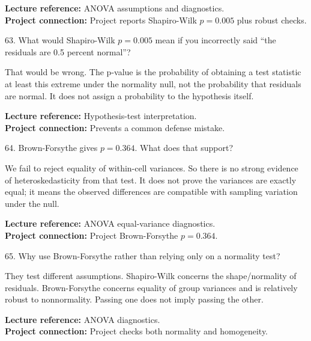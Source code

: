 \documentclass[10.5pt,a4paper]{article}
\newcommand{\chapref}[1]{\textbf{Lecture reference:} #1}
\newcommand{\projectref}[1]{\textbf{Project connection:} #1}
\begin{document}
\begin{refbox}\chapref{ANOVA assumptions and diagnostics.}\\\projectref{Project reports Shapiro-Wilk $p=0.005$ plus robust checks.}\end{refbox}
\begin{qbox}{63. What would Shapiro-Wilk $p=0.005$ mean if you incorrectly said ``the residuals are 0.5 percent normal''?}
\end{qbox}
\begin{answerbox}That would be wrong. The p-value is the probability of obtaining a test statistic at least this extreme under the normality null, not the probability that residuals are normal. It does not assign a probability to the hypothesis itself.\end{answerbox}
\begin{refbox}\chapref{Hypothesis-test interpretation.}\\\projectref{Prevents a common defense mistake.}\end{refbox}
\begin{qbox}{64. Brown-Forsythe gives $p=0.364$. What does that support?}
\end{qbox}
\begin{answerbox}We fail to reject equality of within-cell variances. So there is no strong evidence of heteroskedasticity from that test. It does not prove the variances are exactly equal; it means the observed differences are compatible with sampling variation under the null.\end{answerbox}
\begin{refbox}\chapref{ANOVA equal-variance diagnostics.}\\\projectref{Project Brown-Forsythe $p=0.364$.}\end{refbox}
\begin{qbox}{65. Why use Brown-Forsythe rather than relying only on a normality test?}
\end{qbox}
\begin{answerbox}They test different assumptions. Shapiro-Wilk concerns the shape/normality of residuals. Brown-Forsythe concerns equality of group variances and is relatively robust to nonnormality. Passing one does not imply passing the other.\end{answerbox}
\begin{refbox}\chapref{ANOVA diagnostics.}\\\projectref{Project checks both normality and homogeneity.}\end{refbox}
\end{document}
